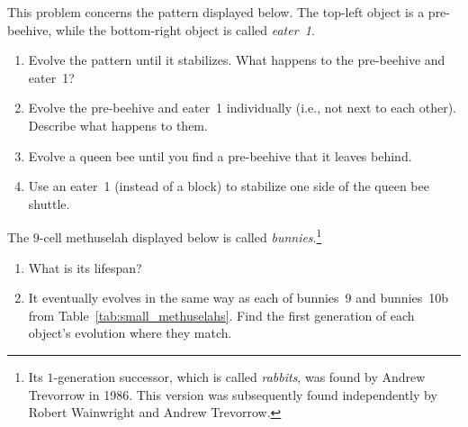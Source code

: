 \begin{multicols}{2}
\begin{problemstar}\label{exer:queen_bee_eater_1}
	This problem concerns the pattern displayed below. The top-left object is a pre-beehive, while the bottom-right object is called \emph{eater~1}.
	\begin{center}
	\end{center}
	
	\begin{enumerate}[label=\bf\color{ocre}(\alph*)]
		\item Evolve the pattern until it stabilizes. What happens to the pre-beehive and eater~1?
		
		\item Evolve the pre-beehive and eater~1 individually (i.e., not next to each other). Describe what happens to them.
		
		\item Evolve a queen bee until you find a pre-beehive that it leaves behind.
		
		\item Use an eater~1 (instead of a block) to stabilize one side of the queen bee shuttle.
	\end{enumerate}
\end{problemstar}


\mfilbreak


\begin{problem}\label{exer:bunnies}
The $9$-cell methuselah displayed below is called \emph{bunnies}.\footnote{Its $1$-generation successor, which is called \emph{rabbits}, was found by Andrew Trevorrow in 1986. This version was subsequently found independently by Robert Wainwright and Andrew Trevorrow.}

\begin{center}
\end{center}

\begin{enumerate}[label=\bf\color{ocre}(\alph*)]
	\item What is its lifespan?
	
	\item It eventually evolves in the same way as each of bunnies~9 and bunnies~10b from Table~\ref{tab:small_methuselahs}. Find the first generation of each object's evolution where they match.
\end{enumerate}
\end{problem}



\end{multicols}
